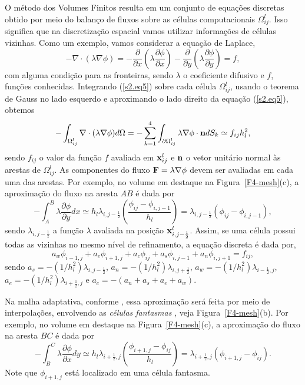 \documentclass[12pt]{article}
\begin{document}
O método dos Volumes Finitos resulta em um conjunto de equações discretas obtido por meio do balanço de fluxos sobre as células computacionais $\Omega^l_{ij}$. Isso significa que na discretização espacial vamos utilizar informações de células vizinhas.  Como um exemplo, vamos considerar a equação de Laplace,  
\begin{equation}\label{s2.eq5}
-\nabla\cdot(\lambda\nabla \phi) = -\dfrac{\partial}{\partial x}\left(\lambda\dfrac{\partial\phi}{\partial x}\right) - \dfrac{\partial}{\partial y}\left(\lambda\dfrac{\partial\phi}{\partial y}\right) = f,
\end{equation}
com alguma condição para as fronteiras, sendo $\lambda$ o coeficiente difusivo e $f$, funções conhecidas. Integrando (\ref{s2.eq5}) sobre cada célula $\Omega^l_{ij}$, usando o teorema de Gauss no lado esquerdo e aproximando o lado direito da equação (\ref{s2.eq5}), obtemos
\begin{equation}\label{s2.eq6}
-\int_{\Omega_{ij}^l}\nabla\cdot(\lambda\nabla \phi)d\Omega  = -\sum_{k=1}^4\int_{\partial\Omega_{ij}^l}\lambda\nabla\phi\cdot{\bf n}dS_k \simeq f_{ij}h_l^2,
\end{equation}
sendo $f_{ij}$ o valor da função $f$ avaliada em ${\bf x}^l_{ij}$ e ${\bf n}$ o vetor unitário normal às arestas de $\Omega_{ij}^l$. As componentes do fluxo ${\bf F} = \lambda\nabla \phi$ devem ser avaliadas em cada uma das arestas. Por exemplo, no volume em destaque na Figura~\ref{F4-mesh}(c), a aproximação do fluxo na aresta $AB$ é dada por
\begin{equation}\label{s2.eq7}
-\int_A^B\lambda\dfrac{\partial\phi}{\partial y}dx \simeq h_l\lambda_{i,j-\frac{1}{2}}\left(\dfrac{\phi_{ij}-\phi_{i,j-1}}{h_l}\right)=\lambda_{i,j-\frac{1}{2}}(\phi_{ij}-\phi_{i,j-1}),
\end{equation}
sendo $\lambda_{i,j-\frac{1}{2}}$ a função $\lambda$ avaliada na posição ${\bf x}^l_{i,j-\frac{1}{2}}$. Assim, se uma célula possui todas as vizinhas no mesmo nível de refinamento, a equação discreta é dada por,
\begin{equation}\label{s2.eq8}
a_w\phi_{i-1,j}+a_e\phi_{i+1,j}+a_c\phi_{ij}+a_s\phi_{i,j-1}+a_n\phi_{i,j+1} = f_{ij},
\end{equation}
sendo $a_s=-(1/h_l^2)\lambda_{i,j-\frac{1}{2}}$, $a_n=-(1/h_l^2)\lambda_{i,j+\frac{1}{2}}$, $a_w=-(1/h_l^2)\lambda_{i-\frac{1}{2},j}$, $a_e=-(1/h_l^2)\lambda_{i+\frac{1}{2},j}$ e $a_c=-(a_n+a_s+a_e+a_w)$. 

Na malha adaptativa, conforme \cite{TRO01}, essa aproximação será feita por meio de interpolações, envolvendo as {\em células fantasmas} \cite{LEV02,TRO01,VER07}, veja Figura~\ref{F4-mesh}(b). Por exemplo, no volume em destaque na Figura~\ref{F4-mesh}(c), a aproximação do fluxo na aresta $BC$ é dada por 
\begin{equation}\label{s2.eq9}
-\int_B^C\lambda\dfrac{\partial\phi}{\partial x}dy \simeq h_l\lambda_{i+\frac{1}{2},j}\left(\dfrac{\phi_{i+1,j}-\phi_{ij}}{h_l}\right)=\lambda_{i+\frac{1}{2},j}(\phi_{i+1,j}-\phi_{ij}).
\end{equation}
Note que $\phi_{i+1,j}$ está localizado em uma célula fantasma. 
\end{document}
